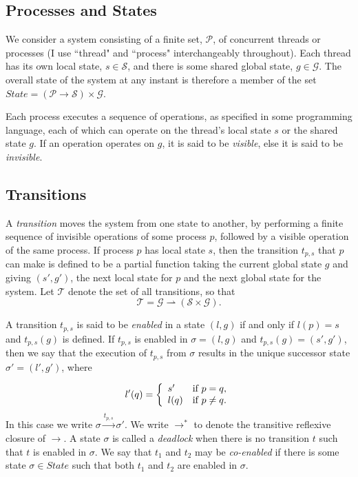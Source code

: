 \documentclass[12pt,a4paper,twoside,openright]{report}
\begin{document}
\subsection{Processes and States}
We consider a system consisting of a finite set, $\mathcal{P}$,
of concurrent threads or processes (I use ``thread" and
``process" interchangeably throughout).
Each thread has its own local state, $s \in \mathcal{S}$, and there
is some shared global state, $g \in \mathcal{G}$. The overall
state of the system at any instant is therefore a member of the set
$ \textit{State} = (\mathcal{P} \to \mathcal{S}) \times \mathcal{G} $.

Each process executes a sequence of operations, as
specified in some programming language, each of which can
operate on the thread's local state $s$ or the shared
state $g$. If an operation
operates on $g$, it is said to be \emph{visible}, else it is said to be
\emph{invisible}.

\subsection{Transitions}
A \emph{transition} moves the system from one state to another,
by performing a finite sequence of invisible operations of some
process $p$, followed by a visible operation of the same process.
If process $p$ has local state $s$, then the transition $t_{p,s}$
that $p$ can make is defined to be a partial function taking the current
global state $g$ and giving $(s', g')$, the next local state for $p$
and the next global state for the system. Let $\mathcal{T}$ denote the
set of all transitions, so that
	\[\mathcal{T} = \mathcal{G} \rightharpoonup
				(\mathcal{S} \times \mathcal{G}).\]

A transition $t_{p,s}$ is said to be \emph{enabled} in a state
$(l, g)$ if and only if $l(p) = s$ and $t_{p,s}(g)$ is defined.
If $t_{p,s}$ is enabled in $\sigma = (l, g)$ and 
$t_{p,s}(g) = (s', g')$, then we say that the
execution of $t_{p,s}$ from $\sigma$ results in the unique successor
state $\sigma' = (l', g')$, where

\[
	l'(q) = \left\{\begin{array}{lr}
				s' & \textmd{if } p = q, \\
				l(q) &\textmd{if } p \neq q.
			\end{array} \right.
\]
In this case we write $\sigma \xrightarrow{t_{p,s}} \sigma'$.
We write $\longrightarrow^*$ to denote the transitive reflexive
closure of $\longrightarrow$.
A state $\sigma$ is called a \emph{deadlock} when there is no transition
$t$ such that $t$ is enabled in $\sigma$. We say that $t_1$ and $t_2$
may be \emph{co-enabled} if there is some state $\sigma \in \textit{State}$
such that both $t_1$ and $t_2$ are enabled in $\sigma$.
\end{document}
